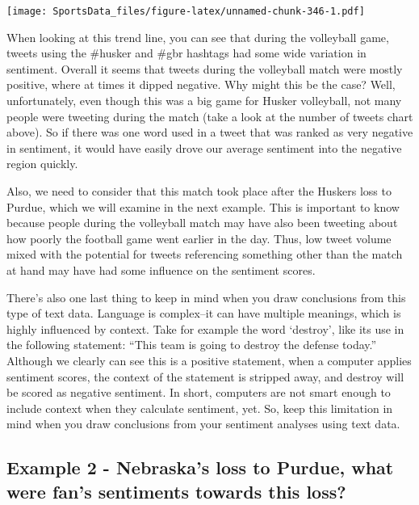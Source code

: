 \documentclass[
]{book}
\begin{document}
\texttt{[image: SportsData\_files/figure-latex/unnamed-chunk-346-1.pdf]}

When looking at this trend line, you can see that during the volleyball game, tweets using the \#husker and \#gbr hashtags had some wide variation in sentiment. Overall it seems that tweets during the volleyball match were mostly positive, where at times it dipped negative. Why might this be the case? Well, unfortunately, even though this was a big game for Husker volleyball, not many people were tweeting during the match (take a look at the number of tweets chart above). So if there was one word used in a tweet that was ranked as very negative in sentiment, it would have easily drove our average sentiment into the negative region quickly.

Also, we need to consider that this match took place after the Huskers loss to Purdue, which we will examine in the next example. This is important to know because people during the volleyball match may have also been tweeting about how poorly the football game went earlier in the day. Thus, low tweet volume mixed with the potential for tweets referencing something other than the match at hand may have had some influence on the sentiment scores.

There's also one last thing to keep in mind when you draw conclusions from this type of text data. Language is complex--it can have multiple meanings, which is highly influenced by context. Take for example the word `destroy', like its use in the following statement: ``This team is going to destroy the defense today.'' Although we clearly can see this is a positive statement, when a computer applies sentiment scores, the context of the statement is stripped away, and destroy will be scored as negative sentiment. In short, computers are not smart enough to include context when they calculate sentiment, yet. So, keep this limitation in mind when you draw conclusions from your sentiment analyses using text data.

\hypertarget{example-2---nebraskas-loss-to-purdue-what-were-fans-sentiments-towards-this-loss}{%
\subsection{Example 2 - Nebraska's loss to Purdue, what were fan's sentiments towards this loss?}\label{example-2---nebraskas-loss-to-purdue-what-were-fans-sentiments-towards-this-loss}}
\end{document}
